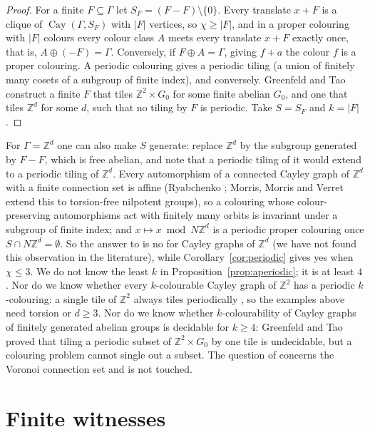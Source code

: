 \documentclass[11pt,a4paper]{amsart}
\theoremstyle{definition}
\newcommand{\Z}{\mathbb{Z}}
\newcommand{\Cay}{\operatorname{Cay}}
\begin{document}
\begin{proof}
For a finite $F\subseteq\Gamma$ let $S_F=(F-F)\setminus\{0\}$. Every translate $x+F$ is a clique of
$\Cay(\Gamma,S_F)$ with $|F|$ vertices, so $\chi\ge|F|$, and in a proper colouring with $|F|$ colours every colour
class $A$ meets every translate $x+F$ exactly once, that is, $A\oplus(-F)=\Gamma$. Conversely, if
$F\oplus A=\Gamma$, giving $f+a$ the colour $f$ is a proper colouring. A periodic colouring gives a periodic tiling
(a union of finitely many cosets of a subgroup of finite index), and conversely. Greenfeld and Tao
\cite[Theorem~1.4 and Corollary~1.6]{GT} construct a finite $F$ that tiles $\Z^2\times G_0$ for some finite abelian
$G_0$, and one that tiles $\Z^d$ for some $d$, such that no tiling by $F$ is periodic. Take $S=S_F$ and $k=|F|$.
\end{proof}

For $\Gamma=\Z^d$ one can also make $S$ generate: replace $\Z^d$ by the subgroup generated by $F-F$, which is free
abelian, and note that a periodic tiling of it would extend to a periodic tiling of $\Z^d$. Every automorphism of a
connected Cayley graph of $\Z^d$ with a finite connection set is affine (Ryabchenko \cite{Ryabchenko}; Morris, Morris
and Verret \cite{MMV} extend this to torsion-free nilpotent groups), so a colouring whose
colour-preserving automorphisms act with finitely many orbits is invariant under a subgroup of finite index; and
$x\mapsto x\bmod N\Z^d$ is a periodic proper colouring once $S\cap N\Z^d=\emptyset$. So the answer to
\cite[Problem~4.6]{AEGHKM} is no for Cayley graphs of $\Z^d$ (we have not found this observation in the
literature), while Corollary~\ref{cor:periodic} gives yes when
$\chi\le3$. We do not know the least $k$ in Proposition~\ref{prop:aperiodic}; it is at least $4$. Nor do we know
whether every $k$-colourable Cayley graph of $\Z^2$ has a periodic $k$-colouring: a single tile of $\Z^2$ always
tiles periodically \cite{Bhattacharya}, so the examples above need torsion or $d\ge3$. Nor do we know whether
$k$-colourability of Cayley graphs of finitely generated abelian groups is decidable for $k\ge4$: Greenfeld and Tao
\cite{GT2} proved that tiling a periodic subset of $\Z^2\times G_0$ by one tile is undecidable, but a colouring
problem cannot single out a subset. The question of \cite{VWZ} concerns the Voronoi connection set and is not
touched.

\section{Finite witnesses}\label{sec:finite}
\end{document}
